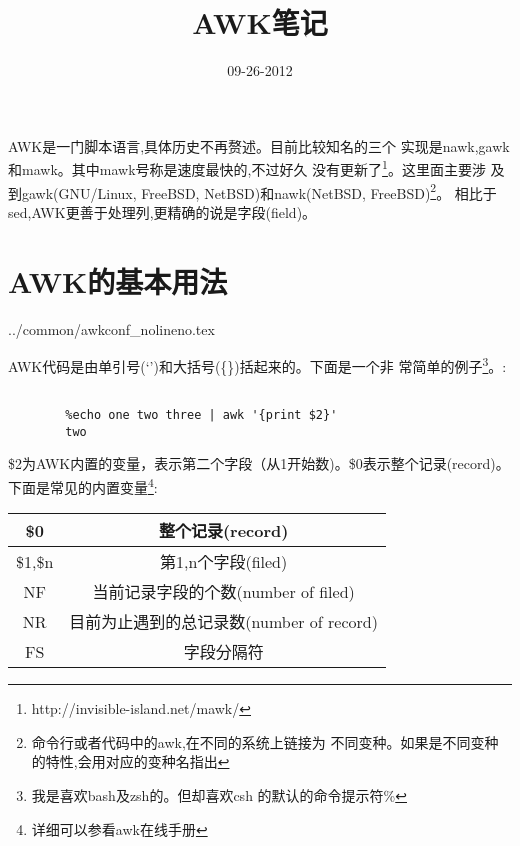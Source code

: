 
\title{AWK笔记}

\date{09-26-2012}


\maketitle

AWK是一门脚本语言,具体历史不再赘述。目前比较知名的三个
实现是nawk,gawk和mawk。其中mawk号称是速度最快的,不过好久
没有更新了\footnote{http://invisible-island.net/mawk/}。这里面主要涉
及到gawk(GNU/Linux, FreeBSD, NetBSD)和nawk(NetBSD,
FreeBSD)\footnote{命令行或者代码中的awk,在不同的系统上链接为
不同变种。如果是不同变种的特性,会用对应的变种名指出}。
相比于sed,AWK更善于处理列,更精确的说是字段(field)。

\section{AWK的基本用法}

 {../common/awkconf_nolineno.tex}


AWK代码是由单引号(`')和大括号(\{\})括起来的。下面是一个非
常简单的例子\footnote{我是喜欢bash及zsh的。但却喜欢csh
的默认的命令提示符\%}。:\\

\begin{lstlisting}[title={简单例子},abovecaptionskip=0.5cm]

        %echo one two three | awk '{print $2}'
        two
\end{lstlisting}

\$2为AWK内置的变量，表示第二个字段（从1开始数)。\$0表示整个记录(record)。
下面是常见的内置变量\footnote{详细可以参看awk在线手册}:\\

\begin{tabular}{| c | c |}
        \hline
        \$0 & 整个记录(record)\\
        \hline
        \$1,\$n & 第1,n个字段(filed)\\
        \hline
        NF & 当前记录字段的个数(number of filed)\\
        \hline
        NR & 目前为止遇到的总记录数(number of record)\\
        \hline
        FS & 字段分隔符\\
        \hline
\end{tabular}
        










